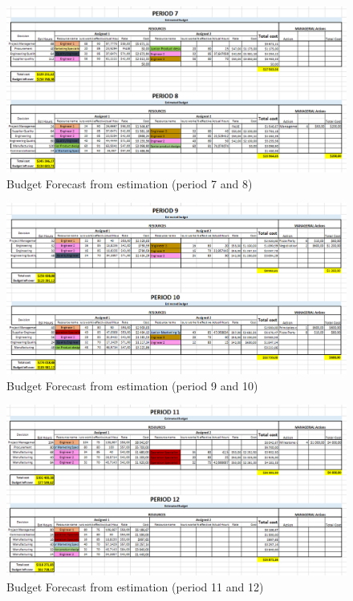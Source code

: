 \begin{appendices}
\begin{landscape}
\begin{figure}[H]
\includegraphics[scale=0.8]{budget_forecast_est_78.PNG}
\caption{Budget Forecast from estimation (period 7 and 8)}
\end{figure}
\begin{figure}[H]
\includegraphics[scale=0.8]{budget_forecast_est_910.PNG}
\caption{Budget Forecast from estimation (period 9 and 10)}
\end{figure}
\begin{figure}[H]
\includegraphics[scale=0.8]{budget_forecast_est_1112.PNG}
\caption{Budget Forecast from estimation (period 11 and 12)}
\end{figure}


\end{landscape}
\end{appendices}
